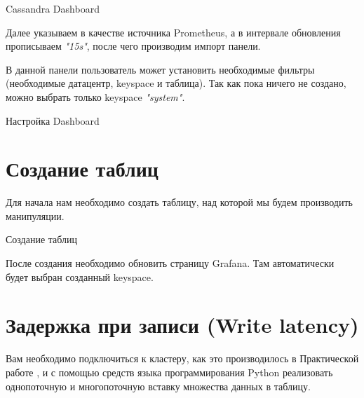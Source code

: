\begin{image}
	\caption{Cassandra Dashboard}
	\label{fig:dashboard:import}
\end{image}

Далее указываем в качестве источника Prometheus, а в интервале
обновления прописываем \textit{"15s"}, после чего производим импорт панели.\par
В данной панели пользователь может установить необходимые фильтры
(необходимые датацентр, keyspace и таблица). Так как пока ничего не создано,
можно выбрать только keyspace \textit{"system"}.

\begin{image}
	\caption{Настройка Dashboard}
	\label{fig:dashboard:setting}
\end{image}

\section{Создание таблиц}

Для начала нам необходимо создать таблицу, над которой мы будем
производить манипуляции.

\begin{image}
	\caption{Создание таблиц}
	\label{fig:keyspace}
\end{image}

После создания необходимо обновить страницу Grafana. Там
автоматически будет выбран созданный keyspace.

\section{Задержка при записи (Write latency)}

Вам необходимо подключиться к кластеру, как это производилось в
Практической работе , и с помощью средств языка программирования Python
реализовать однопоточную и многопоточную вставку множества данных в 
таблицу.

